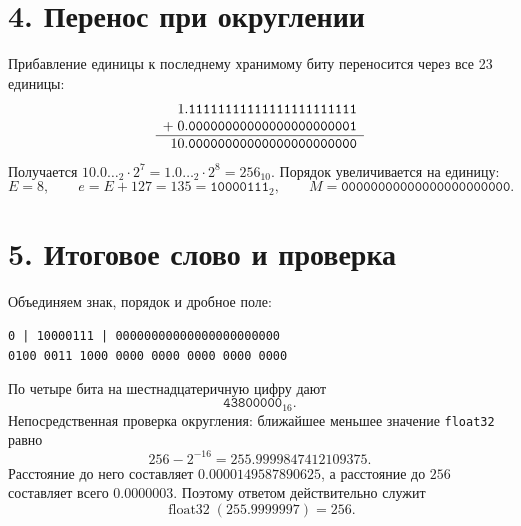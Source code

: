 \documentclass[a4paper,12pt]{extarticle}
\begin{document}
\section*{4. Перенос при округлении}
Прибавление единицы к последнему хранимому биту переносится через все
23 единицы:
\[
\begin{array}{r@{}l}
    1.&\texttt{11111111111111111111111}\\
 +\;0.&\texttt{00000000000000000000001}\\ \hline
   10.&\texttt{00000000000000000000000}
\end{array}
\]
Получается $10.0\ldots_2\cdot2^7=1.0\ldots_2\cdot2^8=256_{10}$.
Порядок увеличивается на единицу:
\[
    E=8,\qquad e=E+127=135=\texttt{10000111}_2,
    \qquad M=\texttt{00000000000000000000000}.
\]

\section*{5. Итоговое слово и проверка}
Объединяем знак, порядок и дробное поле:
\begin{center}
    \texttt{0 | 10000111 | 00000000000000000000000}\\[2mm]
    \texttt{0100 0011 1000 0000 0000 0000 0000 0000}
\end{center}
По четыре бита на шестнадцатеричную цифру дают
\[
    \boxed{\texttt{43800000}_{16}}.
\]
Непосредственная проверка округления: ближайшее меньшее значение
\texttt{float32} равно
\[
    256-2^{-16}=255.9999847412109375.
\]
Расстояние до него составляет $0.0000149587890625$, а расстояние до
$256$ составляет всего $0.0000003$. Поэтому ответом действительно служит
\[
    \boxed{\operatorname{float32}(255.9999997)=256}.
\]
\end{document}
